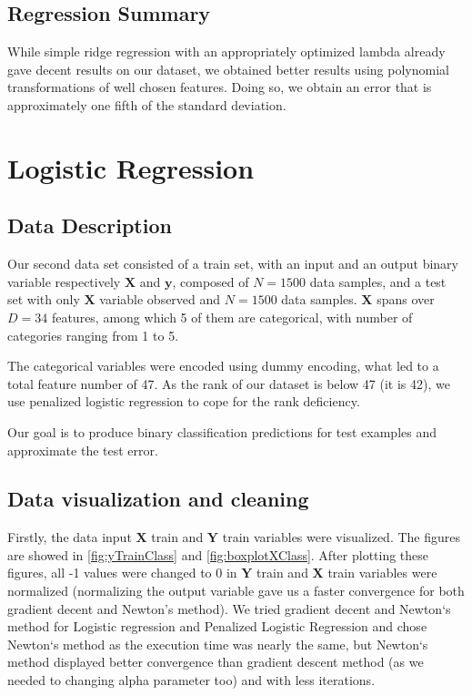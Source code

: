 \documentclass{article} %
\begin{document}
\subsection{Regression Summary}
While simple ridge regression with an appropriately optimized lambda already
gave decent results on our dataset, we obtained better results using polynomial
transformations of well chosen features. Doing so, we obtain an error that is
approximately one fifth of the standard deviation.

\section{Logistic Regression}
\subsection{Data Description}
Our second data set consisted of a train set, with an input and an output binary
variable respectively $\mathbf{X}$ and $\mathbf{y}$, composed of $N=1500$ data
samples, and a test set with only $\mathbf{X}$ variable observed and $N=1500$
data samples. $\mathbf{X}$ spans over $D=34$ features, among which 5 of them are
categorical, with number of categories ranging from 1 to 5.

The categorical variables were encoded using dummy encoding, what led to a total
feature number of 47. As the rank of our dataset is below 47 (it is 42), we use penalized logistic regression to cope for the rank deficiency.

Our goal is to produce binary classification predictions for test examples and approximate the test error.

\subsection{Data visualization and cleaning}
Firstly, the data input $\mathbf{X}$ train and $\mathbf{Y}$ train variables were
visualized. The figures are showed in \ref{fig:yTrainClass} and
\ref{fig:boxplotXClass}. After plotting these figures, all -1 values were
changed to 0 in $\mathbf{Y}$ train and $\mathbf{X}$ train variables were
normalized (normalizing the output variable gave us a faster convergence for
both gradient decent and Newton's method). We tried gradient decent and Newton`s
method for Logistic regression and Penalized Logistic Regression  and chose
Newton`s method as the execution time was nearly the same, but Newton`s method
displayed better convergence than gradient descent method (as we needed to changing alpha parameter too) and with less iterations.
\end{document}
